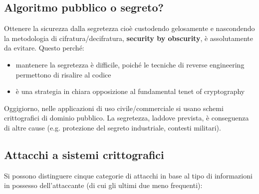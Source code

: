 \subsection{Algoritmo pubblico o segreto?}
Ottenere la sicurezza dalla segretezza cioè custodendo gelosamente e nascondendo la metodologia di cifratura/decifratura, \textbf{security by obscurity}, è assolutamente da evitare. Questo perché:
\begin{itemize} 
  \item mantenere la segretezza è difficile, poiché le tecniche di reverse engineering permettono di risalire al codice
  \item è una strategia in chiara opposizione al fundamental tenet of cryptography
\end{itemize}
Oggigiorno, nelle applicazioni di uso civile/commerciale si usano schemi crittografici di dominio pubblico. La segretezza, laddove prevista, è conseguenza di altre cause (e.g. protezione del segreto industriale, contesti militari).

\subsection{Attacchi a sistemi crittografici}
Si possono distinguere cinque categorie di attacchi in base al tipo di informazioni in possesso dell’attaccante (di cui gli ultimi due meno frequenti):

